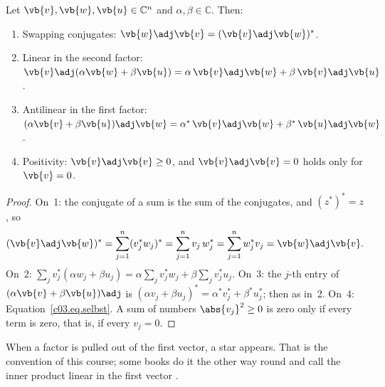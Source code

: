 \begin{proposition}\label{c03.prop.skalarprodukt}
  Let $\vb{v}, \vb{w}, \vb{u} \in \mathbb{C}^n$ and $\alpha, \beta \in \mathbb{C}$. Then:
  \begin{enumerate}
    \item Swapping conjugates: $\vb{w}\adj\vb{v} = (\vb{v}\adj\vb{w})^*$.
    \item Linear in the second factor:
      $\vb{v}\adj(\alpha\vb{w} + \beta\vb{u}) = \alpha\, \vb{v}\adj\vb{w} + \beta\, \vb{v}\adj\vb{u}$.
    \item Antilinear in the first factor:
      $(\alpha\vb{v} + \beta\vb{u})\adj\vb{w} = \alpha^*\, \vb{v}\adj\vb{w} + \beta^*\, \vb{u}\adj\vb{w}$.
    \item Positivity: $\vb{v}\adj\vb{v} \geq 0$, and $\vb{v}\adj\vb{v} = 0$ holds only for
      $\vb{v} = 0$.
  \end{enumerate}
\end{proposition}
\begin{proof}
  On~1: the conjugate of a sum is the sum of the conjugates, and $(z^*)^* = z$, so
  \begin{equation}\label{c03.eq.vertauschen}
    (\vb{v}\adj\vb{w})^* = \sum_{j=1}^{n} (v_j^* w_j)^* = \sum_{j=1}^{n} v_j\, w_j^*
    = \sum_{j=1}^{n} w_j^* v_j = \vb{w}\adj\vb{v} .
  \end{equation}
  On~2: $\sum_j v_j^* (\alpha w_j + \beta u_j) = \alpha \sum_j v_j^* w_j + \beta \sum_j v_j^* u_j$.
  On~3: the $j$-th entry of $(\alpha\vb{v} + \beta\vb{u})\adj$ is
  $(\alpha v_j + \beta u_j)^* = \alpha^* v_j^* + \beta^* u_j^*$; then as in~2. On~4:
  Equation~\eqref{c03.eq.selbst}. A sum of numbers $\abs{v_j}^2 \geq 0$ is zero only if every
  term is zero, that is, if every $v_j = 0$.
\end{proof}

When a factor is pulled out of the first vector, a star appears. That is the convention of
this course; some books do it the other way round and call the inner product linear in the
first vector .

